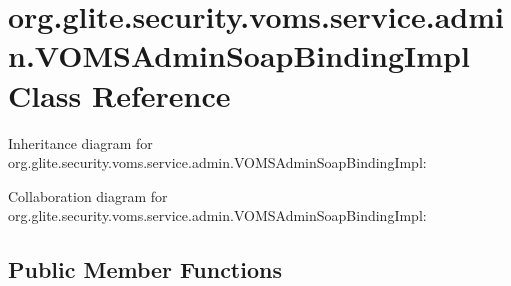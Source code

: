 \hypertarget{classorg_1_1glite_1_1security_1_1voms_1_1service_1_1admin_1_1VOMSAdminSoapBindingImpl}{
\section{org.glite.security.voms.service.admin.VOMSAdminSoapBindingImpl Class Reference}
\label{classorg_1_1glite_1_1security_1_1voms_1_1service_1_1admin_1_1VOMSAdminSoapBindingImpl}
}


Inheritance diagram for org.glite.security.voms.service.admin.VOMSAdminSoapBindingImpl:


Collaboration diagram for org.glite.security.voms.service.admin.VOMSAdminSoapBindingImpl:
\subsection*{Public Member Functions}
